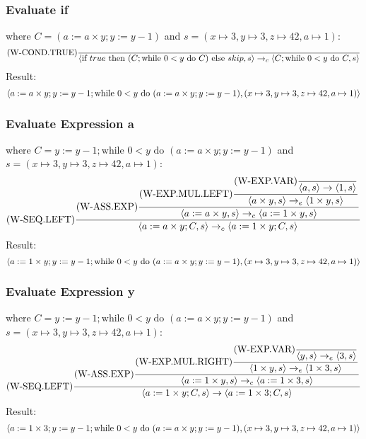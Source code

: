 \documentclass{report}
\begin{document}
            \subsubsection*{Evaluate if}
                where $C = (a:= a \times y; y:= y - 1)$ and $s = (x \mapsto 3, y \mapsto 3, z \mapsto 42, a \mapsto 1)$:
                \[\text{(W-COND.TRUE)}\dfrac{}{\langle \text{if } true \text{ then } (C; \text{while } 0<y \text{ do } C) \text{ else } skip, s \rangle \to_c \langle C; \text{while } 0<y \text{ do } C, s \rangle}\]
                Result:
                \[\langle a:= a \times y; y:= y - 1; \text{while } 0<y \text{ do } (a:= a \times y; y:= y - 1), (x \mapsto 3, y \mapsto 3, z \mapsto 42, a \mapsto 1) \rangle\]
            \subsubsection*{Evaluate Expression a}
                where $C = y:= y - 1;  \text{while } 0<y \text{ do } (a:= a \times y; y:= y - 1)$ and $s = (x \mapsto 3, y \mapsto 3, z \mapsto 42, a \mapsto 1)$:
                \[\text{(W-SEQ.LEFT)}\dfrac{
                    \text{(W-ASS.EXP)}\dfrac{
                        \text{(W-EXP.MUL.LEFT)}\dfrac{
                            \text{(W-EXP.VAR)}\dfrac{}{\langle a, s \rangle \to \langle 1, s \rangle}
                        }{\langle a \times y, s \rangle \to_e \langle 1 \times y, s \rangle}
                    }{\langle a := a \times y, s \rangle \to_c \langle a := 1 \times y, s \rangle}
                }{\langle a := a \times y; C, s \rangle \to_c \langle a := 1 \times y; C, s \rangle}\]
                Result:
                \[\langle a := 1 \times y; y:= y - 1;  \text{while } 0<y \text{ do } (a:= a \times y; y:= y - 1), (x \mapsto 3, y \mapsto 3, z \mapsto 42, a \mapsto 1) \rangle\]
            \subsubsection*{Evaluate Expression y}
                where $C = y:= y - 1;  \text{while } 0<y \text{ do } (a:= a \times y; y:= y - 1)$ and $s = (x \mapsto 3, y \mapsto 3, z \mapsto 42, a \mapsto 1)$:
                \[\text{(W-SEQ.LEFT)}\dfrac{
                    \text{(W-ASS.EXP)}\dfrac{
                        \text{(W-EXP.MUL.RIGHT)}\dfrac{
                            \text{(W-EXP.VAR)}\dfrac{}{\langle y, s \rangle \to_e \langle 3, s \rangle}
                        }{\langle 1 \times y, s \rangle \to_e \langle 1 \times 3, s \rangle}
                    }{\langle a := 1 \times y, s \rangle \to_c \langle a := 1 \times 3, s \rangle}
                }{\langle a := 1 \times y; C, s \rangle \to \langle a := 1 \times 3; C, s \rangle}\]
                Result:
                \[\langle a := 1 \times 3; y:= y - 1;  \text{while } 0<y \text{ do } (a:= a \times y; y:= y - 1), (x \mapsto 3, y \mapsto 3, z \mapsto 42, a \mapsto 1) \rangle\]
\end{document}

